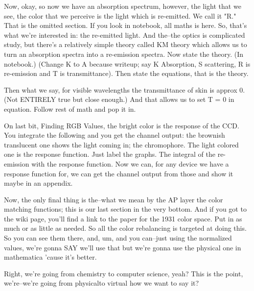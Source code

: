 Now, okay, so now we have an absorption spectrum, however, the light that we see, the color that we perceive is the light which is re-emitted. We call it "R." That is the omitted section. If you look in notebook, all maths is here. So, that's what we're interested in: the re-emitted light. And the--the optics is complicated study, but there's a relatively simple theory called KM theory which allows us to turn an absorption spectra into a re-emission spectra. Now state the theory. (In notebook.) (Change K to A because writeup; say K Absorption, S scattering, R is re-emission and T is transmittance). Then state the equations, that is the theory.

Then what we say, for visible wavelengths the transmittance of skin is approx 0. (Not ENTIRELY true but close enough.) And that allows us to set T = 0 in equation. Follow rest of math and pop it in.

On last bit, Finding RGB Values, the bright color is the response of the CCD. You integrate the following and you get the channel output: the brownish translucent one shows the light coming in; the chromophore. The light colored one is the response function. Just label the graphs. The integral of the re-emission with the response function. Now we can, for any device we have a response function for, we can get the channel output from those and show it maybe in an appendix.

Now, the only final thing is the--what we mean by the AP layer the color matching functions; this is our last section in the very bottom. And if you got to the wiki page, you'll find a link to the paper for the 1931 color space. Put in as much or as little as needed. So all the color rebalancing is targeted at doing this. So you can see them there, and, um, and you can--just using the normalized values, we're gonna SAY we'll use that but we're gonna use the physical one in mathematica 'cause it's better. 


Right, we're going from chemistry to computer science, yeah? This is the point, we're--we're going from physicalto virtual how we want to say it?

